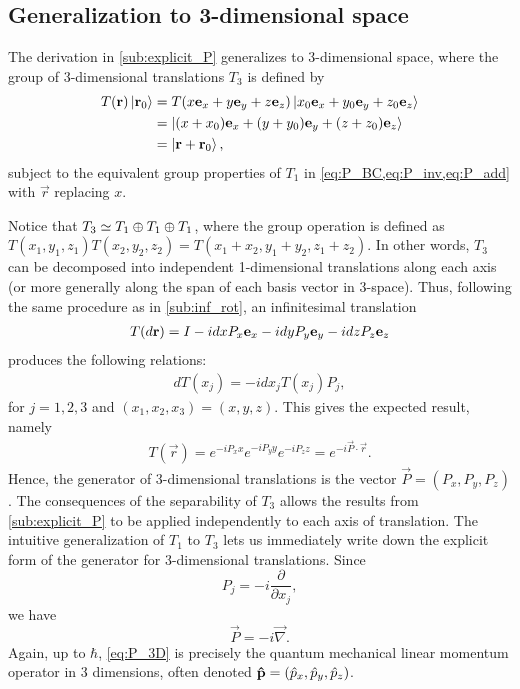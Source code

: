 \subsection{Generalization to 3-dimensional space}\label{sub:3D_translations}
The derivation in \cref{sub:explicit_P} generalizes to 3-dimensional space, where the group of 3-dimensional translations $T_3$ is defined by
\begin{align*}
    T(\mathbf{r})\ket{\mathbf{r}_0}
        &= T(x\mathbf{e}_x + y\mathbf{e}_y + z\mathbf{e}_z)\ket{x_0\mathbf{e}_x + y_0\mathbf{e}_y + z_0\mathbf{e}_z} \\
        &= \ket{(x + x_0)\mathbf{e}_x + (y + y_0)\mathbf{e}_y + (z + z_0)\mathbf{e}_z} \\
        &= \ket{\mathbf{r}+\mathbf{r}_0},
\end{align*}
subject to the equivalent group properties of $T_1$ in \cref{eq:P_BC,eq:P_inv,eq:P_add} with $\vec{r}$ replacing $x$.

\sloppy Notice that $T_3\simeq T_1 \oplus T_1 \oplus T_1$, where the group operation is defined as $T(x_1,y_1,z_1)T(x_2,y_2,z_2) = T(x_1+x_2,y_1+y_2,z_1+z_2)$. In other words, $T_3$ can be decomposed into independent 1-dimensional translations along each axis (or more generally along the span of each basis vector in 3-space). Thus, following the same procedure as in \cref{sub:inf_rot}, an infinitesimal translation
\begin{align*}
    T(d\mathbf{r}) = I - i dx P_x\mathbf{e}_x - idy P_y\mathbf{e}_y - idz P_z\mathbf{e}_z
\end{align*}
produces the following relations:
\begin{align*}
    dT(x_j) = -idx_j T(x_j)P_j,
\end{align*}
for $j=1,2,3$ and $(x_1,x_2,x_3) = (x,y,z)$.
This gives the expected result, namely
\begin{align*}
    T(\vec{r}) = e^{-iP_x x}e^{-iP_y y}e^{-iP_z z} = e^{-i\vec{P}\cdot\vec{r}}.
\end{align*}
Hence, the generator of 3-dimensional translations is the vector $\vec{P}=(P_x,P_y,P_z)$. The consequences of the separability of $T_3$ allows the results from \cref{sub:explicit_P} to be applied independently to each axis of translation. The intuitive generalization of $T_1$ to $T_3$ lets us immediately write down the explicit form of the generator for 3-dimensional translations. Since
\begin{equation}
    P_j = -i\frac{\partial}{\partial x_j},
\end{equation}
we have
\begin{equation}
    \vec{P} = -i\vec{\nabla}.\label{eq:P_3D}
\end{equation}
Again, up to $\hbar$, \cref{eq:P_3D} is precisely the quantum mechanical linear momentum operator in 3 dimensions, often denoted $\mathbf{\hat{p}}=(\hat{p}_x,\hat{p}_y,\hat{p}_z)$.


